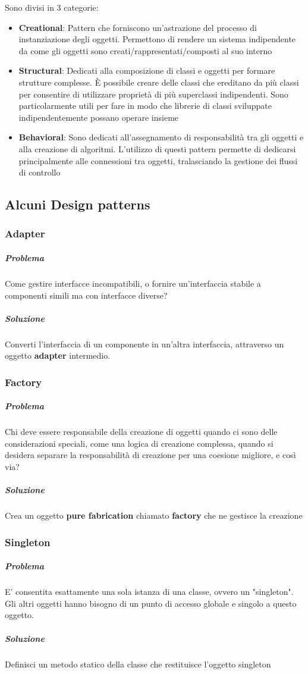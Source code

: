 \documentclass[12pt]{article}
\begin{document}
Sono divisi in 3 categorie:
\begin{itemize}
    \item \textbf{Creational}: Pattern che forniscono un'astrazione del processo di instanziazione degli oggetti. Permettono di rendere un sistema indipendente da come gli oggetti sono creati/rappresentati/composti al suo interno
    \item \textbf{Structural}: Dedicati alla composizione di classi e oggetti per formare strutture complesse. È possibile creare delle classi che ereditano da più classi per consentire di utilizzare proprietà di più superclassi
    indipendenti. Sono particolarmente utili per fare in modo che librerie di classi sviluppate indipendentemente possano operare insieme
    \item \textbf{Behavioral}: Sono dedicati all'assegnamento di responsabilità tra gli oggetti e alla creazione di algoritmi. L'utilizzo di questi pattern permette di dedicarsi principalmente alle connessioni tra oggetti, tralasciando la gestione dei flussi di controllo
\end{itemize}
\newpage
\subsection{Alcuni Design patterns}
\subsubsection{Adapter}
\subparagraph{Problema} Come gestire interfacce incompatibili, o fornire un'interfaccia stabile a componenti simili ma con interfacce diverse?
\subparagraph{Soluzione} Converti l'interfaccia di un componente in un'altra interfaccia, attraverso un oggetto \textbf{adapter} intermedio.
\subsubsection{Factory}
\subparagraph{Problema} Chi deve essere responsabile della creazione di oggetti quando ci sono delle considerazioni speciali, come una logica di creazione complessa, quando si desidera separare la responsabilità di creazione per una coesione migliore, e così via?
\subparagraph{Soluzione} Crea un oggetto \textbf{pure fabrication} chiamato \textbf{factory} che ne gestisce la creazione
\subsubsection{Singleton}
\subparagraph{Problema} E' consentita esattamente una sola istanza di una classe, ovvero un "singleton". Gli altri oggetti hanno bisogno di un punto di accesso globale e singolo a questo oggetto.
\subparagraph{Soluzione} Definisci un metodo statico della classe che restituisce l'oggetto singleton
\end{document}

